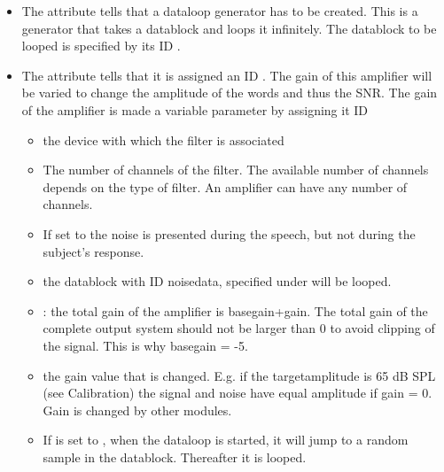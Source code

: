 \begin{itemize}

\item The attribute  tells \apex
that a dataloop generator has to be created. This is a generator
that takes a datablock and loops it infinitely. The datablock to
be looped is specified by its ID .

\item {} The attribute
 tells \apex that it is assigned an
ID . The gain of this amplifier will be varied to
change the amplitude of the words and thus the SNR. The gain of
the amplifier is made a variable parameter by assigning it ID

\begin{itemize}

\item {} the device with which the filter is
associated

\item {} The number of channels of the filter. The
available number of channels depends on the type of filter. An
amplifier can have any number of channels.

\item {} If set to  the noise is
presented during the speech, but not during the subject's
response.

\item {} the datablock with ID noisedata,
specified under  will be looped.

\item {}:  the total gain of the amplifier is
basegain+gain. The total gain of the complete output system should
not be larger than 0 to avoid clipping of the signal. This is why
basegain = -5.

\item {} the gain value that is changed. E.g. if the
targetamplitude is 65 dB SPL (see Calibration) the signal and
noise have equal amplitude if gain = 0. Gain is changed by other
modules.

\item If  is set to , when the
dataloop is started, it will jump to a random sample in the
datablock. Thereafter it is looped.

\end{itemize}

\end{itemize}
   
   

